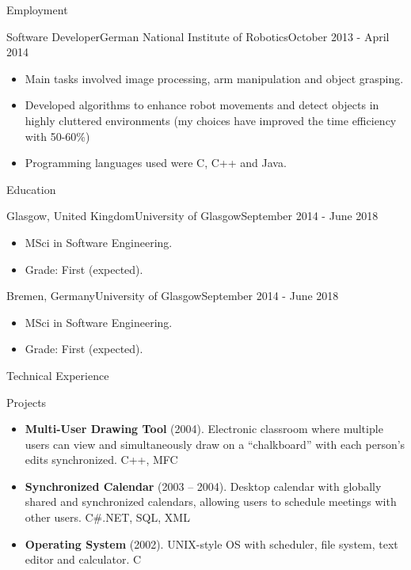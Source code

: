 \documentclass[]{cv}
\begin{document}
\begin{cvsection}{Employment}
		\begin{cvsubsection}{Software Developer}{German National Institute of Robotics}{October 2013 - April 2014}
			\begin{itemize}
				\item Main tasks involved image processing, arm manipulation and object grasping.
				\item Developed algorithms to enhance robot movements and detect objects in highly cluttered environments (my
				choices have improved the time efficiency with 50-60\%)
				\item Programming languages used were C, C++ and Java.
			\end{itemize}
		\end{cvsubsection}

	\end{cvsection}
	
	\begin{cvsection}{Education}
		\begin{cvsubsection}{Glasgow, United Kingdom}{University of Glasgow}{September 2014 - June 2018}
			\begin{itemize}
				\item MSci in Software Engineering.
				\item Grade: First (expected).
			\end{itemize}
		\end{cvsubsection}
		\begin{cvsubsection}{Bremen, Germany}{University of Glasgow}{September 2014 - June 2018}
			\begin{itemize}
				\item MSci in Software Engineering.
				\item Grade: First (expected).
			\end{itemize}
		\end{cvsubsection}

	\end{cvsection}
	
	\begin{cvsection}{Technical Experience}
		\begin{cvsubsection}{Projects}{}{}
			\begin{itemize}
				\item \textbf{Multi-User Drawing Tool} (2004). Electronic classroom where multiple users can view and simultaneously draw on a “chalkboard” with each person’s edits synchronized.  C++, MFC
				\item \textbf{Synchronized Calendar} (2003 – 2004). Desktop calendar with globally shared and synchronized calendars, allowing users to schedule meetings with other users.  C\#.NET, SQL, XML
				\item \textbf{Operating System} (2002).  UNIX-style OS with scheduler, file system, text editor and calculator. C
			\end{itemize}
		\end{cvsubsection}
	\end{cvsection}
	
\end{document}
